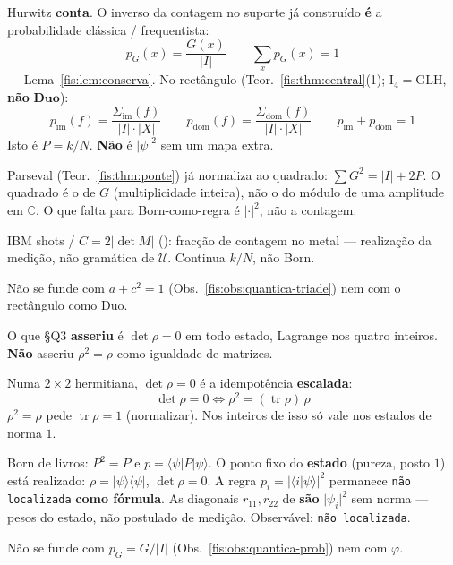 \documentclass[livro.tex]{subfiles}
\begin{document}
\begin{observacao}\label{fis:obs:quantica-prob}
Hurwitz \textbf{conta}. O inverso da contagem no suporte já construído
\textbf{é} a probabilidade clássica / frequentista:
\[
\boxed{\;
p_G(x)=\frac{G(x)}{\lvert I\rvert}
\qquad
\sum_x p_G(x)=1
\;}
\]
--- Lema~\ref{fis:lem:conserva}. No rectângulo
(Teor.~\ref{fis:thm:central}(1); \(\mathrm{I}_{4}=\mathrm{GLH}\),
\textbf{não} \(\mathbf{Duo}\)):
\[
\boxed{\;
p_{\mathrm{im}}(f)=\frac{\Sigma_{\mathrm{im}}(f)}{\lvert I\rvert\cdot\lvert X\rvert}
\qquad
p_{\mathrm{dom}}(f)=\frac{\Sigma_{\mathrm{dom}}(f)}{\lvert I\rvert\cdot\lvert X\rvert}
\qquad
p_{\mathrm{im}}+p_{\mathrm{dom}}=1
\;}
\]
Isto é \(P=k/N\). \textbf{Não} é \(\lvert\psi\rvert^{2}\) sem um mapa extra.

Parseval (Teor.~\ref{fis:thm:ponte}) já normaliza ao quadrado:
\(\sum G^{2}=\lvert I\rvert+2P\). O quadrado é o de \(G\) (multiplicidade
inteira), não o do módulo de uma amplitude em \(\mathbb{C}\). O que falta
para Born-como-regra é \(\lvert\cdot\rvert^{2}\), não a contagem.

IBM shots / \(C=2\lvert\det M\rvert\) ():
fracção de contagem no metal --- realização da medição, não gramática de
\(\mathcal{U}\). Continua \(k/N\), não Born.

Não se funde com \(a+c^{2}=1\) (Obs.~\ref{fis:obs:quantica-triade})
nem com o rectângulo como Duo.
\end{observacao}

\begin{observacao}\label{fis:obs:quantica-born}
O que  §Q3 \textbf{asseriu} é \(\det\rho=0\)
em todo estado, Lagrange nos quatro inteiros. \textbf{Não} asseriu
\(\rho^{2}=\rho\) como igualdade de matrizes.

Numa \(2\times2\) hermitiana, \(\det\rho=0\) é a idempotência
\textbf{escalada}:
\[
\boxed{\;
\det\rho=0
\iff
\rho^{2}=(\operatorname{tr}\rho)\,\rho
\;}
\]
\(\rho^{2}=\rho\) pede \(\operatorname{tr}\rho=1\) (normalizar). Nos
inteiros de  isso só vale nos estados de norma \(1\).

Born de livros: \(P^{2}=P\) e \(p=\langle\psi\rvert P\lvert\psi\rangle\).
O ponto fixo do \textbf{estado} (pureza, posto \(1\)) está realizado:
\(\rho=\lvert\psi\rangle\langle\psi\rvert\), \(\det\rho=0\).
A regra \(p_i=\lvert\langle i\rvert\psi\rangle\rvert^{2}\)
permanece \texttt{não localizada} \textbf{como fórmula}.
As diagonais \(r_{11},r_{22}\) de  \textbf{são}
\(\lvert\psi_i\rvert^{2}\) sem norma --- pesos do estado, não postulado
de medição. Observável: \texttt{não localizada}.

Não se funde com \(p_G=G/\lvert I\rvert\)
(Obs.~\ref{fis:obs:quantica-prob}) nem com \(\varphi\).
\end{observacao}
\end{document}
